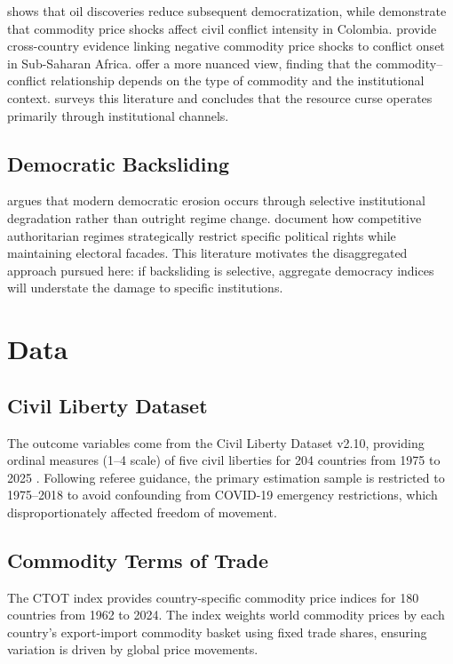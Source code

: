 \documentclass[12pt]{article}
\begin{document}
\citet{tsui2011} shows that oil discoveries reduce subsequent democratization, while \citet{dubeVargas2013} demonstrate that commodity price shocks affect civil conflict intensity in Colombia. \citet{bruckner2010} provide cross-country evidence linking negative commodity price shocks to conflict onset in Sub-Saharan Africa. \citet{bazziBlattman2014} offer a more nuanced view, finding that the commodity--conflict relationship depends on the type of commodity and the institutional context. \citet{ross2015} surveys this literature and concludes that the resource curse operates primarily through institutional channels.

\subsection{Democratic Backsliding}

\citet{bermeo2016} argues that modern democratic erosion occurs through selective institutional degradation rather than outright regime change. \citet{levitskyWay2010} document how competitive authoritarian regimes strategically restrict specific political rights while maintaining electoral facades. This literature motivates the disaggregated approach pursued here: if backsliding is selective, aggregate democracy indices will understate the damage to specific institutions.

\section{Data}

\subsection{Civil Liberty Dataset}

The outcome variables come from the Civil Liberty Dataset v2.10, providing ordinal measures (1--4 scale) of five civil liberties for 204 countries from 1975 to 2025 \citep{coppedge2023}. Following referee guidance, the primary estimation sample is restricted to 1975--2018 to avoid confounding from COVID-19 emergency restrictions, which disproportionately affected freedom of movement.

\subsection{Commodity Terms of Trade}

The CTOT index \citep{grussKebhaj2019} provides country-specific commodity price indices for 180 countries from 1962 to 2024. The index weights world commodity prices by each country's export-import commodity basket using fixed trade shares, ensuring variation is driven by global price movements.
\end{document}
